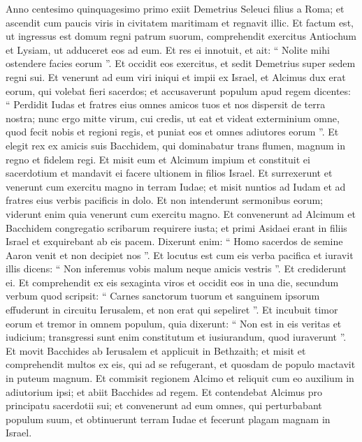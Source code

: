 \begin{biblechapter}
\begin{biblechapter}
\begin{biblechapter}
\begin{biblechapter}
\begin{biblechapter}
\begin{biblechapter}
\begin{biblechapter}
\verse Anno centesimo quinquagesimo primo exiit Demetrius Seleuci filius a Roma; et ascendit cum paucis viris in civitatem maritimam et regnavit illic. 
\verse Et factum est, ut ingressus est domum regni patrum suorum, comprehendit exercitus Antiochum et Lysiam, ut adduceret eos ad eum. 
\verse Et res ei innotuit, et ait: “ Nolite mihi ostendere facies eorum ”. 
\verse Et occidit eos exercitus, et sedit Demetrius super sedem regni sui. 
\verse Et venerunt ad eum viri iniqui et impii ex Israel, et Alcimus dux erat eorum, qui volebat fieri sacerdos; 
\verse et accusaverunt populum apud regem dicentes: “ Perdidit Iudas et fratres eius omnes amicos tuos et nos dispersit de terra nostra; 
\verse nunc ergo mitte virum, cui credis, ut eat et videat exterminium omne, quod fecit nobis et regioni regis, et puniat eos et omnes adiutores eorum ”.
 \verse Et elegit rex ex amicis suis Bacchidem, qui dominabatur trans flumen, magnum in regno et fidelem regi. Et misit eum 
\verse et Alcimum impium et constituit ei sacerdotium et mandavit ei facere ultionem in filios Israel. 
\verse Et surrexerunt et venerunt cum exercitu magno in terram Iudae; et misit nuntios ad Iudam et ad fratres eius verbis pacificis in dolo. 
\verse Et non intenderunt sermonibus eorum; viderunt enim quia venerunt cum exercitu magno. 
\verse Et convenerunt ad Alcimum et Bacchidem congregatio scribarum requirere iusta; 
 \verse et primi Asidaei erant in filiis Israel et exquirebant ab eis pacem. 
\verse Dixerunt enim: “ Homo sacerdos de semine Aaron venit et non decipiet nos ”. 
 \verse Et locutus est cum eis verba pacifica et iuravit illis dicens: “ Non inferemus vobis malum neque amicis vestris ”. 
\verse Et crediderunt ei. Et comprehendit ex eis sexaginta viros et occidit eos in una die, secundum verbum quod scripsit:
 \verse “ Carnes sanctorum tuorum et sanguinem ipsorum effuderunt in circuitu Ierusalem, et non erat qui sepeliret ”.
 \verse Et incubuit timor eorum et tremor in omnem populum, quia dixerunt: “ Non est in eis veritas et iudicium; transgressi sunt enim constitutum et iusiurandum, quod iuraverunt ”. 
\verse Et movit Bacchides ab Ierusalem et applicuit in Bethzaith; et misit et comprehendit multos ex eis, qui ad se refugerant, et quosdam de populo mactavit in puteum magnum. 
\verse Et commisit regionem Alcimo et reliquit cum eo auxilium in adiutorium ipsi; et abiit Bacchides ad regem.
 \verse Et contendebat Alcimus pro principatu sacerdotii sui; 
\verse et convenerunt ad eum omnes, qui perturbabant populum suum, et obtinuerunt terram Iudae et fecerunt plagam magnam in Israel. 

\end{biblechapter}
\end{biblechapter}
\end{biblechapter}
\end{biblechapter}
\end{biblechapter}
\end{biblechapter}
\end{biblechapter}
